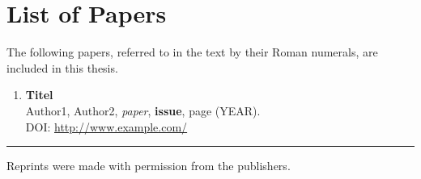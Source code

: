 \chapter{List of Papers}

\vspace{-5pt} %

The following papers, referred to in the text by their Roman numerals, are included in this thesis.

\vspace{0pt} %


\begin{enumerate}[P{A}PER I: ]

\setlength{\itemsep}{3.3mm} %



\item\textbf{Titel}\\
Author1, Author2, \emph{paper}, \textbf{issue}, page (YEAR).\\
DOI: \href{http://www.example.com/}{http://www.example.com/} 

\end{enumerate}

\noindent
\rule{\linewidth}{0.5mm}

\vspace{2mm}

\noindent
Reprints were made with permission from the publishers.



